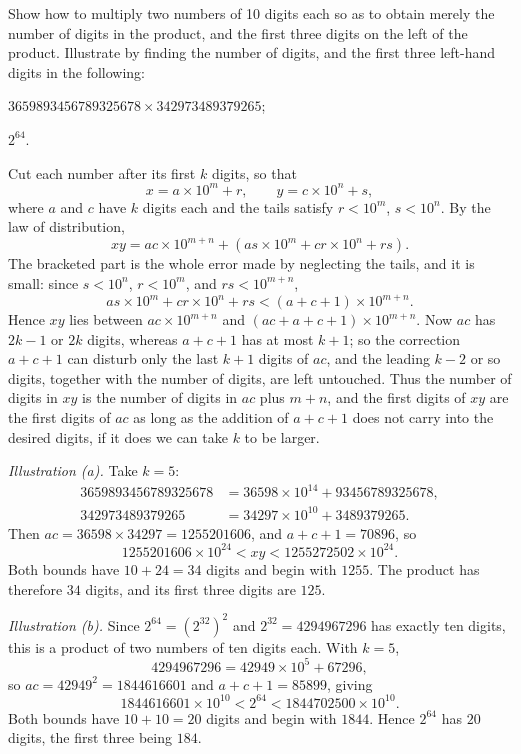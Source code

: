 \documentclass[DIN, pagenumber=false, fontsize=11pt, parskip=half]{scrartcl}
\begin{document}
\begin{problems}[from=1,step=1]
    \problem Show how to multiply two numbers of 10 digits each so as to obtain merely the number of digits in the product, and the first three digits on the left of the product. Illustrate by finding the number of digits, and the first three left-hand digits in the following:
    \begin{parts}
        \item $3659893456789325678 \times 342973489379265$;
        \item $2^{64}$.
    \end{parts}

    \answer Cut each number after its first $k$ digits, so that
    \[
        x = a \times 10^{m} + r, \qquad y = c \times 10^{n} + s,
    \]
    where $a$ and $c$ have $k$ digits each and the tails satisfy $r < 10^{m}$, $s < 10^{n}$. By the law of distribution,
    \[
        xy = ac \times 10^{m+n} + (as \times 10^{m} + cr \times 10^{n} + rs).
    \]
    The bracketed part is the whole error made by neglecting the tails, and it is small: since $s < 10^{n}$, $r < 10^{m}$, and $rs < 10^{m+n}$,
    \[
        as \times 10^{m} + cr \times 10^{n} + rs < (a + c + 1) \times 10^{m+n}.
    \]
    Hence $xy$ lies between $ac \times 10^{m+n}$ and $(ac + a + c + 1) \times 10^{m+n}$. Now $ac$ has $2k - 1$ or $2k$ digits, whereas $a + c + 1$ has at most $k + 1$; so the correction $a + c + 1$ can disturb only the last $k + 1$ digits of $ac$, and the leading $k - 2$ or so digits, together with the number of digits, are left untouched. Thus the number of digits in $xy$ is the number of digits in $ac$ plus $m + n$, and the first digits of $xy$ are the first digits of $ac$ as long as the addition of $a + c + 1$ does not carry into the desired digits, if it does we can take $k$ to be larger.

    \textit{Illustration (a).} Take $k = 5$:
    \begin{align*}
        3659893456789325678 &= 36598 \times 10^{14} + 93456789325678, \\
        342973489379265 &= 34297 \times 10^{10} + 3489379265.
    \end{align*}
    Then $ac = 36598 \times 34297 = 1255201606$, and $a + c + 1 = 70896$, so
    \[
        1255201606 \times 10^{24} < xy < 1255272502 \times 10^{24}.
    \]
    Both bounds have $10 + 24 = 34$ digits and begin with $1255$. The product has therefore $34$ digits, and its first three digits are $125$.

    \textit{Illustration (b).} Since $2^{64} = (2^{32})^{2}$ and $2^{32} = 4294967296$ has exactly ten digits, this is a product of two numbers of ten digits each. With $k = 5$,
    \[
        4294967296 = 42949 \times 10^{5} + 67296,
    \]
    so $ac = 42949^{2} = 1844616601$ and $a + c + 1 = 85899$, giving
    \[
        1844616601 \times 10^{10} < 2^{64} < 1844702500 \times 10^{10}.
    \]
    Both bounds have $10 + 10 = 20$ digits and begin with $1844$. Hence $2^{64}$ has $20$ digits, the first three being $184$.


\end{problems}
\end{document}
